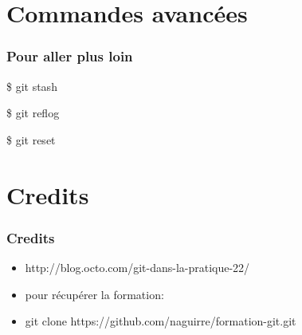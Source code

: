 \documentclass{beamer}
\begin{document}

\section{Commandes avancées}
\begin{frame}
  \frametitle{Pour aller plus loin}
  \begin{semiverbatim}
    \$ git stash

    \$ git reflog

    \$ git reset
  \end{semiverbatim}
\end{frame}

\section{Credits}
\begin{frame}
  \frametitle{Credits}
  \begin{itemize}
  \item http://blog.octo.com/git-dans-la-pratique-22/
  \item pour récupérer la formation:
  \item git clone https://github.com/naguirre/formation-git.git
  \end{itemize}
  
\end{frame}
\end{document}
